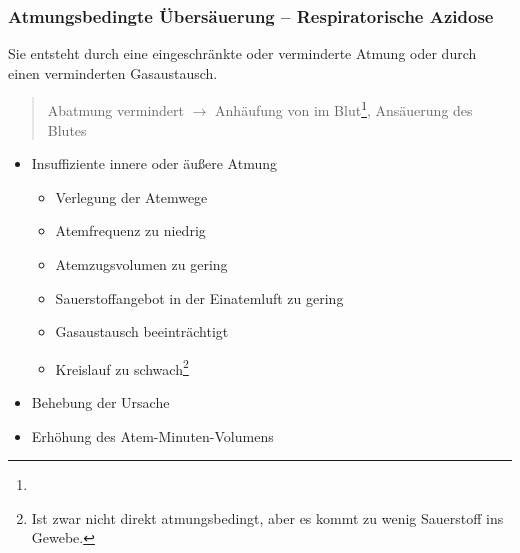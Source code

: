 \subsubsection{Atmungsbedingte Übersäuerung -- Respiratorische Azidose}%
\label{bkm:RefHeading35233321}%
\label{topic:azidose-respiratorische}%
%
%

{
Sie entsteht durch eine eingeschränkte oder verminderte Atmung oder durch einen
verminderten Gasaustausch.

\begin{quote}
  Abatmung vermindert ${\rightarrow}$ Anhäufung von
 im Blut\footnote{}, Ansäuerung des
Blutes
\end{quote}
}{}{}{}{}




{%

\begin{itemize}
  \item Insuffiziente innere oder äußere Atmung
  \begin{itemize}
    \item Verlegung der Atemwege
    \item Atemfrequenz zu niedrig
    \item Atemzugsvolumen zu gering
    \item Sauerstoffangebot in der Einatemluft zu gering
    \item Gasaustausch beeinträchtigt
    \item Kreislauf zu schwach\footnote{Ist zwar nicht
    direkt atmungsbedingt, aber es kommt zu wenig
    Sauerstoff ins Gewebe.}
  \end{itemize}
\end{itemize}
}{}{}{}{}

{}{

\begin{itemize}
    \item Behebung der Ursache
    \item Erhöhung des Atem-Minuten-Volumens
\end{itemize}
}






